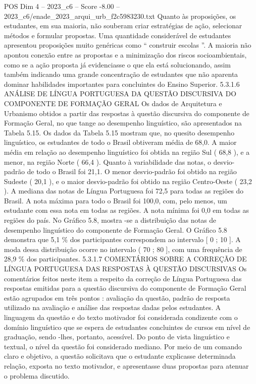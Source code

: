 \begin{textsample}{POS Dim 4 – 2023\_c6 – Score -8.00 – 2023\_c6/enade\_2023\_arqui\_urb\_f2c5983230.txt}
Quanto às proposições, os estudantes, em sua maioria, não souberam criar estratégias de ação, selecionar métodos e formular propostas.
Uma quantidade considerável de estudantes apresentou proposições muito genéricas como “ construir escolas ”.
A maioria não apontou conexão entre as propostas e a minimização dos riscos socioambientais, como se a ação proposta já evidenciasse o que ela está solucionando, assim também indicando uma grande concentração de estudantes que não aparenta dominar habilidades importantes para concluintes do Ensino Superior. 5.3.1.6 ANÁLISE DE LÍNGUA PORTUGUESA DA QUESTÃO DISCURSIVA DO COMPONENTE DE FORMAÇÃO GERAL Os dados de Arquitetura e Urbanismo obtidos a partir das respostas à questão discursiva do componente de Formação Geral, no que tange ao desempenho linguístico, são apresentados na Tabela 5.15.
Os dados da Tabela 5.15 mostram que, no quesito desempenho linguístico, os estudantes de todo o Brasil obtiveram média de 68,0.
A maior média em relação ao desempenho linguístico foi obtida na região Sul ( 68,8 ), e a menor, na região Norte ( 66,4 ).
Quanto à variabilidade das notas, o desvio-padrão de todo o Brasil foi 21,1.
O menor desvio-padrão foi obtido na região Sudeste ( 20,1 ), e o maior desvio-padrão foi obtido na região Centro-Oeste ( 23,2 ).
A mediana das notas de Língua Portuguesa foi 72,5 para todas as regiões do Brasil.
A nota máxima para todo o Brasil foi 100,0, com, pelo menos, um estudante com essa nota em todas as regiões.
A nota mínima foi 0,0 em todas as regiões do país.
No Gráfico 5.8, mostra -se a distribuição das notas de desempenho linguístico do componente de Formação Geral.
O Gráfico 5.8 demonstra que 5,1 \% dos participantes correspondem ao intervalo [ 0 ; 10 ].
A moda dessa distribuição ocorre no intervalo ( 70 ; 80 ], com uma frequência de 28,9 \% dos participantes. 5.3.1.7 COMENTÁRIOS SOBRE A CORREÇÃO DE LÍNGUA PORTUGUESA DAS RESPOSTAS À QUESTÃO DISCURSIVAS Os comentários feitos neste item a respeito da correção de Língua Portuguesa das respostas emitidas para a questão discursiva do componente de Formação Geral estão agrupados em três pontos : avaliação da questão, padrão de resposta utilizado na avaliação e análise das respostas dadas pelos estudantes.
A linguagem da questão e do texto motivador foi considerada condizente com o domínio linguístico que se espera de estudantes concluintes de cursos em nível de graduação, sendo -lhes, portanto, acessível.
Do ponto de vista linguístico e textual, o nível da questão foi considerado mediano.
Por meio de um comando claro e objetivo, a questão solicitava que o estudante explicasse determinada relação, exposta no texto motivador, e apresentasse duas propostas para atenuar o problema discutido.

\end{textsample}
